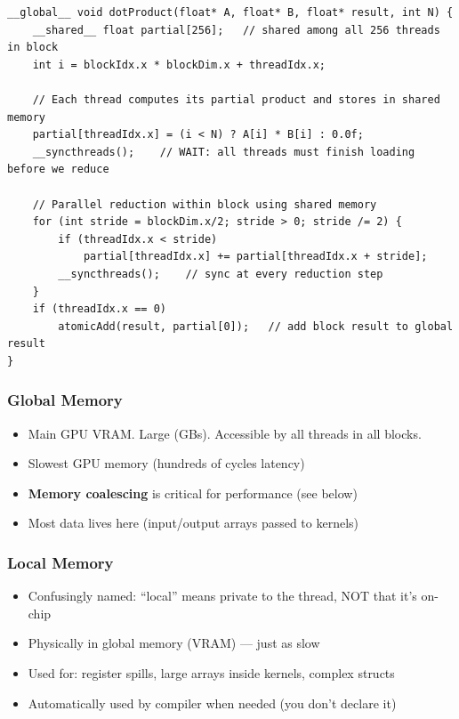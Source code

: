 \documentclass[11pt,a4paper]{article}
\begin{document}
\begin{lstlisting}
__global__ void dotProduct(float* A, float* B, float* result, int N) {
    __shared__ float partial[256];   // shared among all 256 threads in block
    int i = blockIdx.x * blockDim.x + threadIdx.x;

    // Each thread computes its partial product and stores in shared memory
    partial[threadIdx.x] = (i < N) ? A[i] * B[i] : 0.0f;
    __syncthreads();    // WAIT: all threads must finish loading before we reduce

    // Parallel reduction within block using shared memory
    for (int stride = blockDim.x/2; stride > 0; stride /= 2) {
        if (threadIdx.x < stride)
            partial[threadIdx.x] += partial[threadIdx.x + stride];
        __syncthreads();    // sync at every reduction step
    }
    if (threadIdx.x == 0)
        atomicAdd(result, partial[0]);   // add block result to global result
}
\end{lstlisting}

\subsubsection{Global Memory}
\begin{itemize}[noitemsep]
  \item Main GPU VRAM. Large (GBs). Accessible by all threads in all blocks.
  \item Slowest GPU memory (hundreds of cycles latency)
  \item \textbf{Memory coalescing} is critical for performance (see below)
  \item Most data lives here (input/output arrays passed to kernels)
\end{itemize}

\subsubsection{Local Memory}
\begin{itemize}[noitemsep]
  \item Confusingly named: ``local'' means private to the thread, NOT that it's on-chip
  \item Physically in global memory (VRAM) --- just as slow
  \item Used for: register spills, large arrays inside kernels, complex structs
  \item Automatically used by compiler when needed (you don't declare it)
\end{itemize}
\end{document}

